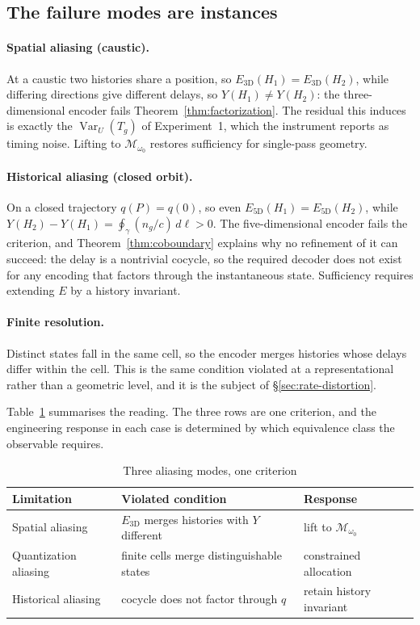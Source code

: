\documentclass[11pt]{article}
\newcommand{\Mopt}{\mathcal{M}_{\omega_0}}
\begin{document}
\subsection{The failure modes are instances}

\paragraph{Spatial aliasing (caustic).} At a caustic two histories share a position, so
$E_{3\mathrm{D}}(H_1)=E_{3\mathrm{D}}(H_2)$, while differing directions give different
delays, so $Y(H_1)\neq Y(H_2)$: the three-dimensional encoder fails
Theorem~\ref{thm:factorization}. The residual this induces is exactly the
$\operatorname{Var}_U(T_g)$ of Experiment~1, which the instrument reports as timing noise.
Lifting to $\Mopt$ restores sufficiency for single-pass geometry.

\paragraph{Historical aliasing (closed orbit).} On a closed trajectory $q(P)=q(0)$, so
even $E_{5\mathrm{D}}(H_1)=E_{5\mathrm{D}}(H_2)$, while
$Y(H_2)-Y(H_1)=\oint_\gamma(n_g/c)\,d\ell>0$. The five-dimensional encoder fails the
criterion, and Theorem~\ref{thm:coboundary} explains why no refinement of it can succeed:
the delay is a nontrivial cocycle, so the required decoder does not exist for any encoding
that factors through the instantaneous state. Sufficiency requires extending $E$ by a
history invariant.

\paragraph{Finite resolution.} Distinct states fall in the same cell, so the encoder merges
histories whose delays differ within the cell. This is the same condition violated at a
representational rather than a geometric level, and it is the subject of
\S\ref{sec:rate-distortion}.

Table~\ref{tab:threelimits} summarises the reading. The three rows are one criterion, and
the engineering response in each case is determined by which equivalence class the
observable requires.

\begin{table}[t]
\centering
\caption{Three aliasing modes, one criterion}
\label{tab:threelimits}
\begin{tabular}{@{}lll@{}}
\toprule
Limitation & Violated condition & Response \\
\midrule
Spatial aliasing & $E_{3\mathrm{D}}$ merges histories with $Y$ different & lift to $\Mopt$ \\
Quantization aliasing & finite cells merge distinguishable states & constrained allocation \\
Historical aliasing & cocycle does not factor through $q$ & retain history invariant \\
\bottomrule
\end{tabular}
\end{table}
\end{document}
